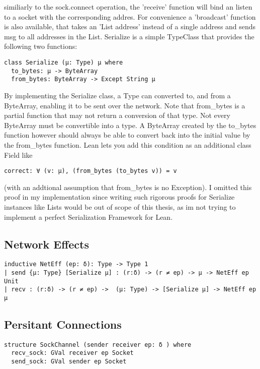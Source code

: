 similiarly to the sock.connect operation, the 'receive' function will bind an listen to a socket with the corresponding addres. For convenience a 'broadcast' function is also available, that takes an 'List address' instead of a single address and sends msg to all addresses in the List.
\newline
Serialize is a simple TypeClass that provides the following two functions:
\begin{lstlisting}[language=lean]
class Serialize (μ: Type) μ where
  to_bytes: μ -> ByteArray
  from_bytes: ByteArray -> Except String μ
\end{lstlisting}
By implementing the Serialize class, a Type can converted to, and from a ByteArray, enabling it to be sent over the network. Note that from_bytes is a partial function that may not return a conversion of that type. Not every ByteArray must be convertible into a type. A ByteArray created by the to_bytes function however should always be able to convert back into the initial value by the from_bytes function. Lean lets you add this condition as an additional class Field like
\begin{lstlisting}[language=lean]
 correct: ∀ (v: μ), (from_bytes (to_bytes v)) = v
\end{lstlisting}
(with an addtional assumption that from_bytes is no Exception). I omitted this proof in my implementation since writing such rigorous proofs for Serialize instances like Lists would be out of scope of this thesis, as im not trying to implement a perfect Serialization Framework for Lean.

\subsection{Network Effects}

\begin{lstlisting}[language=lean]
inductive NetEff (ep: δ): Type -> Type 1
| send {μ: Type} [Serialize μ] : (r:δ) -> (r ≠ ep) -> μ -> NetEff ep Unit
| recv : (r:δ) -> (r ≠ ep) ->  (μ: Type) -> [Serialize μ] -> NetEff ep μ
\end{lstlisting}
\subsection{Persitant Connections}

\begin{lstlisting}[language=lean]
structure SockChannel (sender receiver ep: δ ) where
  recv_sock: GVal receiver ep Socket
  send_sock: GVal sender ep Socket
\end{lstlisting}

